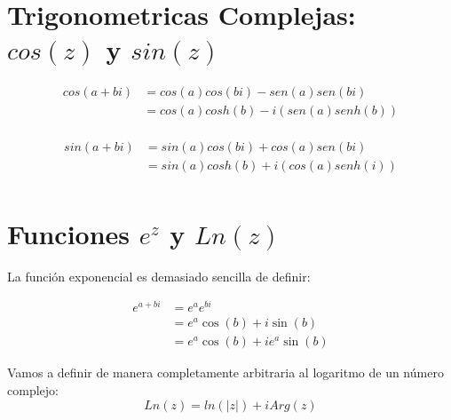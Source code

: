 \documentclass[12pt, fleqn]{report}                             %
\newcommand{\Wrap}[1]{\left( #1 \right)}                        %
\newenvironment{MultiLineEquation}[1]                           %
        {\begin{equation}\begin{alignedat}{#1}}                     %
        {\end{alignedat}\end{equation}}                             %
\newcommand{\Cos}[1]{\cos\Wrap{#1}}                             %
\newcommand{\Sin}[1]{\sin\Wrap{#1}}                             %
\newcommand \Cis[1]  {\Cos{#1} + i \Sin{#1}}                    %
\begin{document}
        \section{Trigonometricas Complejas: $cos(z)$ y $sin(z)$}

            \begin{MultiLineEquation}{2}
                cos(a+bi)   &= cos(a)cos(bi) - sen(a)sen(bi)    \\
                            &= cos(a)cosh(b) - i(sen(a)senh(b)) \\
            \end{MultiLineEquation}

            \begin{MultiLineEquation}{2}
                sin(a+bi)   &= sin(a)cos(bi) + cos(a)sen(bi)    \\
                            &= sin(a)cosh(b) + i(cos(a)senh(i)) \\
            \end{MultiLineEquation}





        \clearpage
        \section{Funciones $e^z$ y $Ln(z)$}


            La función exponencial es demasiado sencilla de definir:

            \begin{MultiLineEquation}{2}
                e^{a+bi}    &= e^a e^{bi}                   \\
                            &= e^a \Cis{b}                  \\
                            &= e^a \Cos{b} + i e^a \Sin{b}  
            \end{MultiLineEquation}


            Vamos a definir de manera completamente arbitraria al
            logaritmo de un número complejo:
            \begin{equation}
                Ln(z) = ln(|z|) + i Arg(z)
            \end{equation}
\end{document}

